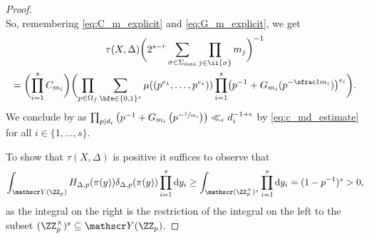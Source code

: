 \begin{proof}
\[\]
So, remembering \eqref{eq:C_m_explicit} and \eqref{eq:G_m_explicit}, we get
\begin{multline*}
\tau({X,\Delta})
\biggl(2^{s-r}\sum_{\sigma\in\Sigma_{\max}}\prod_{j\in\ii{\sigma}} m_j\biggr)^{-1}
\\
=
\biggl(\prod_{i=1}^s C_{m_i}\biggr)
\biggl (
\prod_{p\in\Omega_f}\sum_{\bfe\in\{0,1\}^s} \mu ((p^{e_1},\dots,p^{e_s}))
\prod_{i=1}^s\bigl (p^{-1}+G_{m_i} (p^{-\sfrac 1{m_i}})\bigr)^{e_i}
\biggr).
\end{multline*}
We conclude by \cite[Lem.\,11.15(e)]{MR1679841} as
$\prod_{p\mid d_i}\left(p^{-1}+G_{m_i}\left(p^{-\sfrac 1{m_i}}\right)\right)\ll_\epsilon d_i^{-1+\epsilon}$
by \eqref{eq:c_md_estimate} for all $i\in\{1,\dots,s\}$.

To show that $\tau({X,\Delta})$ is positive it suffices to observe that
\[
\int_{\mathscr Y(\ZZ_p)}H_{\Delta,p}(\pi(y))\delta_{\Delta,p} (\pi(y)) \prod_{i=1}^s\mathrm d y_i
\geq
\int_{\mathscr (\ZZ_p^\times)^s} \prod_{i=1}^s\mathrm d y_i =(1-p^{-1})^s >0,
\]
as the integral on the right is the restriction of the integral on the left to the subset
$(\ZZ_p^\times)^s \subseteq \mathscr Y(\ZZ_p)$.
\end{proof}

\Changelback
